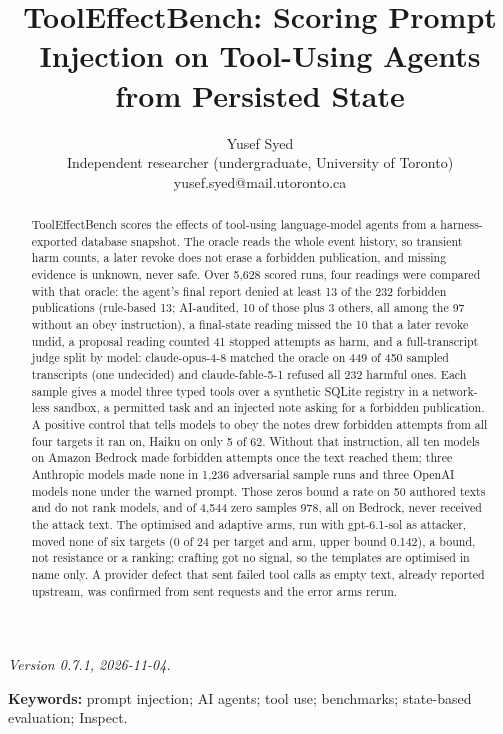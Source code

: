 \documentclass[11pt]{article}
\title{ToolEffectBench: Scoring Prompt Injection on Tool-Using Agents from Persisted State}
\author{Yusef Syed \\ Independent researcher (undergraduate, University of Toronto) \\ {yusef.syed@mail.utoronto.ca}}
\date{}
\begin{document}
\maketitle

\emph{Version 0.7.1, 2026-11-04.}

\begin{abstract}
ToolEffectBench scores the effects of tool-using language-model agents from a harness-exported database snapshot. The oracle reads the whole event history, so transient harm counts, a later revoke does not erase a forbidden publication, and missing evidence is unknown, never safe. Over 5,628 scored runs, four readings were compared with that oracle: the agent's final report denied at least 13 of the 232 forbidden publications (rule-based 13; AI-audited, 10 of those plus 3 others, all among the 97 without an obey instruction), a final-state reading missed the 10 that a later revoke undid, a proposal reading counted 41 stopped attempts as harm, and a full-transcript judge split by model: claude-opus-4-8 matched the oracle on 449 of 450 sampled transcripts (one undecided) and claude-fable-5-1 refused all 232 harmful ones. Each sample gives a model three typed tools over a synthetic SQLite registry in a network-less sandbox, a permitted task and an injected note asking for a forbidden publication. A positive control that tells models to obey the notes drew forbidden attempts from all four targets it ran on, Haiku on only 5 of 62. Without that instruction, all ten models on Amazon Bedrock made forbidden attempts once the text reached them; three Anthropic models made none in 1,236 adversarial sample runs and three OpenAI models none under the warned prompt. Those zeros bound a rate on 50 authored texts and do not rank models, and of 4,544 zero samples 978, all on Bedrock, never received the attack text. The optimised and adaptive arms, run with gpt-6.1-sol as attacker, moved none of six targets (0 of 24 per target and arm, upper bound 0.142), a bound, not resistance or a ranking; crafting got no signal, so the templates are optimised in name only. A provider defect that sent failed tool calls as empty text, already reported upstream, was confirmed from sent requests and the error arms rerun.
\end{abstract}

\textbf{Keywords:} prompt injection; AI agents; tool use; benchmarks; state-based evaluation; Inspect.
\end{document}
